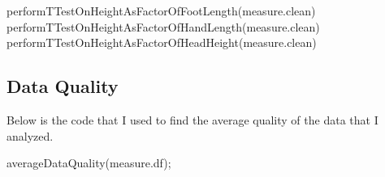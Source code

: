 \documentclass[]{article}
\newenvironment{Shaded}{\begin{snugshade}}{\end{snugshade}}
\newcommand{\FunctionTok}[1]{\textcolor[rgb]{0.00,0.00,0.00}{#1}}
\newcommand{\NormalTok}[1]{#1}
\begin{document}
\begin{Shaded}
\begin{Highlighting}[]
\FunctionTok{performTTestOnHeightAsFactorOfFootLength}\NormalTok{(measure.clean)}
\FunctionTok{performTTestOnHeightAsFactorOfHandLength}\NormalTok{(measure.clean)}
\FunctionTok{performTTestOnHeightAsFactorOfHeadHeight}\NormalTok{(measure.clean)}
\end{Highlighting}
\end{Shaded}

\subsection{Data Quality}

Below is the code that I used to find the average quality of the data
that I analyzed.

\begin{Shaded}
\begin{Highlighting}[]
\FunctionTok{averageDataQuality}\NormalTok{(measure.df);}
\end{Highlighting}
\end{Shaded}







\newpage
\theendnotes

\newpage
\begin{auxmulticols}{1}
\singlespacing 


\end{auxmulticols}

\newpage
{
\hypersetup{linkcolor=black}
\setcounter{tocdepth}{3}
\tableofcontents
}
\end{document}
